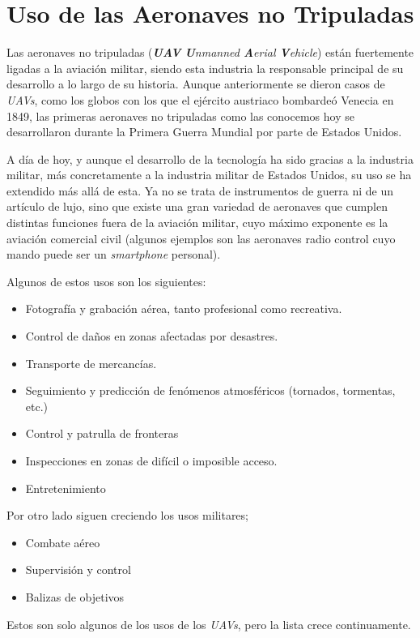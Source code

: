 \section{Uso de las Aeronaves no Tripuladas}
Las aeronaves no tripuladas (\emph{\textbf{UAV} \textbf{U}nmanned \textbf{A}erial \textbf{V}ehicle}) están fuertemente ligadas a la aviación militar, siendo esta industria la responsable principal de su desarrollo a lo largo de su historia.
Aunque anteriormente se dieron casos de \emph{UAVs}, como los globos con los que el ejército austriaco bombardeó Venecia en 1849, las primeras aeronaves no tripuladas como las conocemos hoy se desarrollaron durante la Primera Guerra Mundial por parte de Estados Unidos.

A día de hoy, y aunque el desarrollo de la tecnología ha sido gracias a la industria militar, más concretamente a la industria militar de Estados Unidos, su uso se ha extendido más allá de esta. Ya no se trata de instrumentos de guerra ni de un artículo de lujo, sino que existe una gran variedad de aeronaves que cumplen distintas funciones fuera de la aviación militar, cuyo máximo exponente es la aviación comercial civil (algunos ejemplos son las aeronaves radio control cuyo mando puede ser un \emph{smartphone} personal).

Algunos de estos usos son los siguientes:
\begin{itemize}
	\item Fotografía y grabación aérea, tanto profesional como recreativa.
	\item Control de daños en zonas afectadas por desastres.
	\item Transporte de mercancías.
	\item Seguimiento y predicción de fenómenos atmosféricos (tornados, tormentas, etc.)
	\item Control y patrulla de fronteras
	\item Inspecciones en zonas de difícil o imposible acceso.
	\item Entretenimiento
\end{itemize}

Por otro lado siguen creciendo los usos militares;
\begin{itemize}
	\item Combate aéreo
	\item Supervisión y control
	\item Balizas de objetivos
\end{itemize}
Estos son solo algunos de los usos de los \emph{UAVs}, pero la lista crece continuamente.


